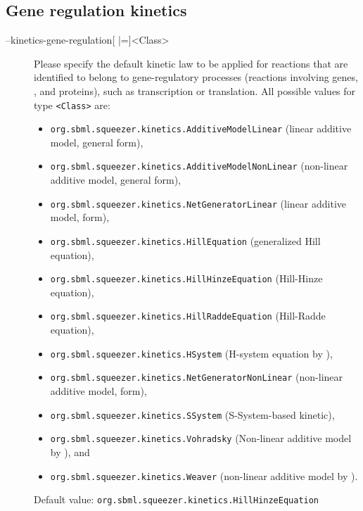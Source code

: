\subsection{Gene regulation kinetics}
\begin{description}
\item[--kinetics-gene-regulation{[} |={]}<Class>]
  Please specify the default kinetic law to be applied for reactions
  that are identified to belong to gene-regulatory processes (reactions
  involving genes, \RNA, and proteins), such as transcription or
  translation.
  All possible values for type \texttt{<Class>} are:
  \begin{itemize}
  \item\texttt{org.sbml.squeezer.kinetics.AdditiveModelLinear} (linear additive model, general form),
  \item\texttt{org.sbml.squeezer.kinetics.AdditiveModelNonLinear} (non-linear additive model, general form),
  \item\texttt{org.sbml.squeezer.kinetics.NetGeneratorLinear} (linear additive model, \NetGenerator form),
  \item\texttt{org.sbml.squeezer.kinetics.HillEquation} (generalized Hill equation),
  \item\texttt{org.sbml.squeezer.kinetics.HillHinzeEquation} (Hill-Hinze equation), 
  \item\texttt{org.sbml.squeezer.kinetics.HillRaddeEquation} (Hill-Radde equation),
  \item\texttt{org.sbml.squeezer.kinetics.HSystem} (H-system equation by \citealp{Spieth2006}),
  \item\texttt{org.sbml.squeezer.kinetics.NetGeneratorNonLinear} (non-linear additive model, \NetGenerator form),
  \item\texttt{org.sbml.squeezer.kinetics.SSystem} (S-System-based kinetic),
  \item\texttt{org.sbml.squeezer.kinetics.Vohradsky} (Non-linear additive model by \citealp*{Vu2007}), and
  \item\texttt{org.sbml.squeezer.kinetics.Weaver} (non-linear additive model by \citealp{Weaver1999}).
  \end{itemize}
  Default value: \texttt{org.sbml.squeezer.kinetics.HillHinzeEquation}


\end{description}
